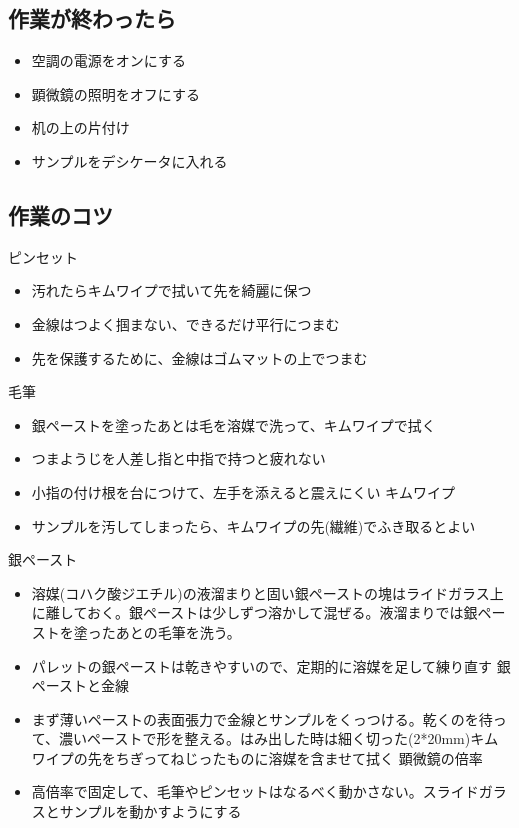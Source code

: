 \documentclass[11pt,a4paper]{jsarticle}
\begin{document}
\subsection{作業が終わったら} 
\begin{itemize}
\item 空調の電源をオンにする
\item 顕微鏡の照明をオフにする
\item 机の上の片付け
\item サンプルをデシケータに入れる
\end{itemize}
 
 \subsection{作業のコツ} 
ピンセット
\begin{itemize}
\item 汚れたらキムワイプで拭いて先を綺麗に保つ
\item 金線はつよく掴まない、できるだけ平行につまむ
\item 先を保護するために、金線はゴムマットの上でつまむ
\end{itemize}
 
毛筆
\begin{itemize}
\item 銀ペーストを塗ったあとは毛を溶媒で洗って、キムワイプで拭く
\item つまようじを人差し指と中指で持つと疲れない
\item 小指の付け根を台につけて、左手を添えると震えにくい
キムワイプ
\item サンプルを汚してしまったら、キムワイプの先(繊維)でふき取るとよい
\end{itemize}
 
銀ペースト
\begin{itemize}
\item 溶媒(コハク酸ジエチル)の液溜まりと固い銀ペーストの塊はライドガラス上に離しておく。銀ペーストは少しずつ溶かして混ぜる。液溜まりでは銀ペーストを塗ったあとの毛筆を洗う。
\item パレットの銀ペーストは乾きやすいので、定期的に溶媒を足して練り直す
銀ペーストと金線
\item まず薄いペーストの表面張力で金線とサンプルをくっつける。乾くのを待って、濃いペーストで形を整える。はみ出した時は細く切った(2*20mm)キムワイプの先をちぎってねじったものに溶媒を含ませて拭く
顕微鏡の倍率
\item 高倍率で固定して、毛筆やピンセットはなるべく動かさない。スライドガラスとサンプルを動かすようにする
\end{itemize}
 
\end{document}
